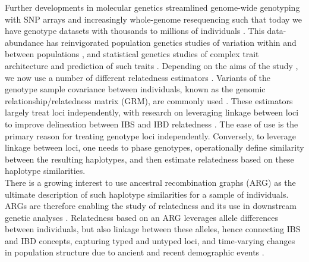 \begin{tcolorbox}[breakable,pad at break*=1mm, colback=blue!5!white,colframe=blue!75!black,title=Box 1: A Brief History of Genetic Relatedness]

Further developments in molecular genetics streamlined genome-wide
genotyping with SNP arrays and increasingly whole-genome resequencing such
that today we have genotype datasets with thousands to millions of individuals
\citep[e.g.][]{turnbull2018hundred, bycroft2018genome, RosFreixedes2022pig}.
%
This data-abundance has reinvigorated population genetics studies of
variation within and between populations
\citep{begun2007population, langley2012genomic},
and statistical genetics studies of
complex trait architecture \citep{burton2007genome, abdellaoui202315} and
prediction of such traits \citep{meuwissen2001prediction, meuwissen2013accelerating}.
%
Depending on the aims of the study \citep{speed2015relatedness}, we now use
a number of different relatedness estimators
\citep[e.g.][]{vanraden2008efficient, yang2010common, manichaikul2010robust,
speed2012improved, weir2017unified, weir2018how, ochoa2021estimating, maryhuard2023fast}.
%
Variants of the genotype sample covariance between individuals,
known as the genomic relationship/relatedness matrix (GRM),
are commonly used \citep{vanraden2008efficient, yang2010common, speed2012improved}.
%
These estimators largely treat loci independently,
with research on leveraging linkage between loci to improve
delineation between IBS and IBD relatedness
\citep[e.g.][]{visscher2006assumption, browning2012identity, thompson2013identity,
hickey2013genomic, edwards2015two, pook2019haploblocker, saada2020identity}.
%
The ease of use is the primary reason for treating genotype loci independently.
%
Conversely, to leverage linkage between loci, one needs to phase genotypes, operationally
define similarity between the resulting haplotypes, and then estimate relatedness
based on these haplotype similarities. \\


There is a growing interest to use ancestral recombination graphs (ARG)
as the ultimate description of such haplotype similarities for a sample of individuals.
%
ARGs are therefore enabling the study of relatedness and its use in downstream genetic analyses
\citep{fan2022genealogical, tsambos2022efficient, zhang2023biobank, link2023tree, schraiber2024unifying}.
%
Relatedness based on an ARG leverages allele differences between individuals,
but also linkage between these alleles, hence
connecting IBS and IBD concepts,
capturing typed and untyped loci, and
time-varying changes in population structure due to ancient and recent demographic events
\citep{fan2022genealogical, young2022discovering, zhang2023biobank, harris2023using}.

\end{tcolorbox}